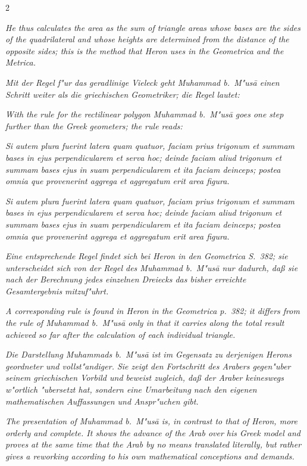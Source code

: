\documentclass[10pt,a4paper]{article}
\begin{document}
\begin{paracol}{2}
\switchcolumn

\textit{He thus calculates the area as the sum of triangle areas whose bases are the sides of the quadrilateral and whose heights are determined from the distance of the opposite sides; this is the method that Heron uses in the \textit{Geometrica} and the \textit{Metrica}.}

\switchcolumn*

\textit{Mit der Regel f"ur das geradlinige Vieleck geht Muhammad b.\ M"us\=a einen Schritt weiter als die griechischen Geometriker; die Regel lautet:}

\switchcolumn

\textit{With the rule for the rectilinear polygon Muhammad b.\ M"us\=a goes one step further than the Greek geometers; the rule reads:}

\switchcolumn*

\textit{\textit{Si autem plura fuerint latera quam quatuor, faciam prius trigonum et summam bases in ejus perpendicularem et serva hoc; deinde faciam aliud trigonum et summam bases ejus in suam perpendicularem et ita faciam deinceps; postea omnia que provenerint aggrega et aggregatum erit area figura.}}

\switchcolumn

\textit{\textit{Si autem plura fuerint latera quam quatuor, faciam prius trigonum et summam bases in ejus perpendicularem et serva hoc; deinde faciam aliud trigonum et summam bases ejus in suam perpendicularem et ita faciam deinceps; postea omnia que provenerint aggrega et aggregatum erit area figura.}}

\switchcolumn*

\textit{Eine entsprechende Regel findet sich bei Heron in den \textit{Geometrica} S.\ 382; sie unterscheidet sich von der Regel des Muhammad b.\ M"us\=a nur dadurch, da\ss{} sie nach der Berechnung jedes einzelnen Dreiecks das bisher erreichte Gesamtergebnis mitzuf"uhrt.}

\switchcolumn

\textit{A corresponding rule is found in Heron in the \textit{Geometrica} p.\ 382; it differs from the rule of Muhammad b.\ M"us\=a only in that it carries along the total result achieved so far after the calculation of each individual triangle.}

\switchcolumn*

\textit{Die Darstellung Muhammads b.\ M"us\=a ist im Gegensatz zu derjenigen Herons geordneter und vollst"andiger. Sie zeigt den Fortschritt des Arabers gegen"uber seinem griechischen Vorbild und beweist zugleich, da\ss{} der Araber keineswegs w"ortlich "ubersetzt hat, sondern eine Umarbeitung nach den eigenen mathematischen Auffassungen und Anspr"uchen gibt.}

\switchcolumn

\textit{The presentation of Muhammad b.\ M"us\=a is, in contrast to that of Heron, more orderly and complete. It shows the advance of the Arab over his Greek model and proves at the same time that the Arab by no means translated literally, but rather gives a reworking according to his own mathematical conceptions and demands.}

\end{paracol}
\end{document}
